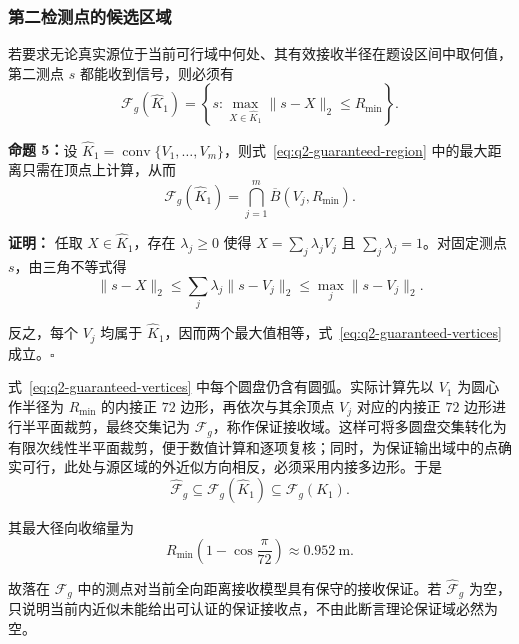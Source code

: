 \documentclass[withoutpreface,bwprint]{cumcmthesis}
\begin{document}
\subsubsection{第二检测点的候选区域}

若要求无论真实源位于当前可行域中何处、其有效接收半径在题设区间中取何值，第二测点 $s$ 都能收到信号，则必须有
\begin{equation}
  \mathcal F_g(\widehat K_1)
  =\left\{s:\max_{X\in\widehat K_1}
  \|s-X\|_2\leq R_{\min}\right\}.
  \label{eq:q2-guaranteed-region}
\end{equation}

\noindent\textbf{命题 5：}{\kaishu 设 $\widehat K_1=\operatorname{conv}\{V_1,\ldots,V_m\}$，则式~\eqref{eq:q2-guaranteed-region} 中的最大距离只需在顶点上计算，从而}
\begin{equation}
  \mathcal F_g(\widehat K_1)
  =\bigcap_{j=1}^{m}\overline B(V_j,R_{\min}).
  \label{eq:q2-guaranteed-vertices}
\end{equation}

\noindent\textbf{证明：}
任取 $X\in\widehat K_1$，存在 $\lambda_j\geq0$ 使得 $X=\sum_j\lambda_jV_j$ 且 $\sum_j\lambda_j=1$。对固定测点 $s$，由三角不等式得
\begin{equation}
  \|s-X\|_2
  \leq\sum_j\lambda_j\|s-V_j\|_2
  \leq\max_j\|s-V_j\|_2.
\end{equation}

反之，每个 $V_j$ 均属于 $\widehat K_1$，因而两个最大值相等，式~\eqref{eq:q2-guaranteed-vertices} 成立。\hfill$\square$

式~\eqref{eq:q2-guaranteed-vertices} 中每个圆盘仍含有圆弧。实际计算先以 $V_1$ 为圆心作半径为 $R_{\min}$ 的内接正 $72$ 边形，再依次与其余顶点 $V_j$ 对应的内接正 $72$ 边形进行半平面裁剪，最终交集记为 $\widehat{\mathcal F}_g$，称作保证接收域。这样可将多圆盘交集转化为有限次线性半平面裁剪，便于数值计算和逐项复核；同时，为保证输出域中的点确实可行，此处与源区域的外近似方向相反，必须采用内接多边形。于是
\begin{equation}
  \widehat{\mathcal F}_g
  \subseteq\mathcal F_g(\widehat K_1)
  \subseteq\mathcal F_g(K_1).
  \label{eq:q2-guaranteed-inclusion}
\end{equation}

其最大径向收缩量为
\begin{equation}
  R_{\min}\left(1-\cos\frac{\pi}{72}\right)
  \approx0.952\ \mathrm{m}.
\end{equation}

故落在 $\widehat{\mathcal F}_g$ 中的测点对当前全向距离接收模型具有保守的接收保证。若 $\widehat{\mathcal F}_g$ 为空，只说明当前内近似未能给出可认证的保证接收点，不由此断言理论保证域必然为空。
\end{document}
